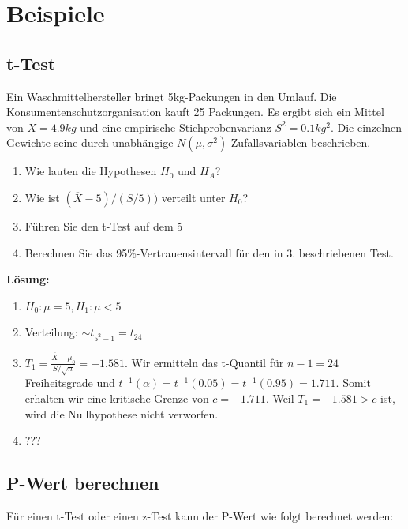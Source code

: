 \documentclass[10pt,a4paper,twocolumn]{article}
\begin{document}
\section{Beispiele}

\subsection{t-Test}
Ein Waschmittelhersteller bringt 5kg-Packungen in den Umlauf. Die Konsumentenschutzorganisation kauft 25 Packungen. Es ergibt sich ein Mittel von $\overline{X}=4.9kg$ und eine empirische Stichprobenvarianz $S^2 = 0.1kg^2$. Die einzelnen Gewichte seine durch unabhängige $N(\mu,\sigma^2)$ Zufallsvariablen beschrieben.

\begin{enumerate}
\item Wie lauten die Hypothesen $H_0$ und $H_A$?
\item Wie ist $(\overline{X}-5) / (S / 5))$ verteilt unter $H_0$?
\item Führen Sie den t-Test auf dem 5%
\item Berechnen Sie das 95\%-Vertrauensintervall für den in 3. beschriebenen Test.
\end{enumerate}

\vspace{10pt}

\textbf{Lösung:}
\begin{enumerate}
\item $H_0: \mu = 5, H_1: \mu < 5$
\item Verteilung: $\sim t_{5^2-1} = t_{24}$
\item $T_1 = \frac{\overline{X}-\mu_0}{S/\sqrt{n}} = -1.581$. Wir ermitteln das t-Quantil für $n-1 = 24$ Freiheitsgrade und $t^{-1}(\alpha) = t^{-1}(0.05) = t^{-1}(0.95) = 1.711$. Somit erhalten wir eine kritische Grenze von $c = -1.711$. Weil $T_1 = -1.581 > c$ ist, wird die Nullhypothese nicht verworfen.
\item ???
\end{enumerate}

\subsection{P-Wert berechnen}
Für einen t-Test oder einen z-Test kann der P-Wert wie folgt berechnet werden:

\vspace{10pt}
\end{document}
